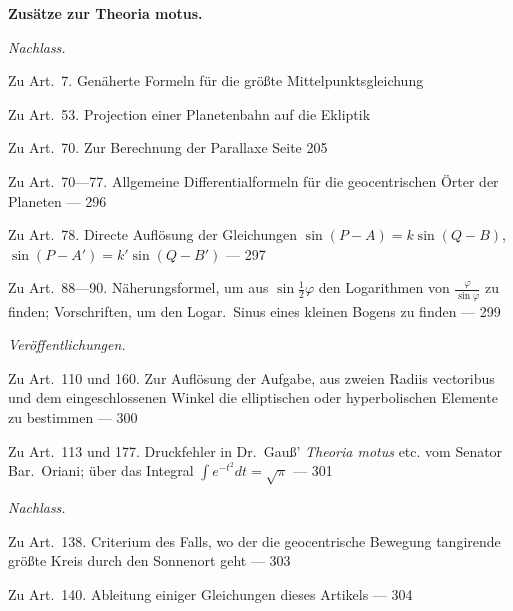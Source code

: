\documentclass[10pt,a4paper]{article}
\newenvironment{hangparas}[2]{\setlength{\hangindent}{#1}\setlength{\hangafter}{#2}}{}
\begin{document}
\vspace{0.3em}

\noindent\textbf{Zusätze zur Theoria motus.}

\vspace{0.2em}

\noindent\textit{Nachlass.}

\vspace{0.2em}

\begin{hangparas}{1em}{1}
\noindent Zu Art.~7. Genäherte Formeln für die größte Mittelpunktsgleichung

\noindent Zu Art.~53. Projection einer Planetenbahn auf die Ekliptik

\noindent Zu Art.~70. Zur Berechnung der Parallaxe \hfill Seite 205

\noindent Zu Art.~70---77. Allgemeine Differentialformeln für die geocentrischen Örter der Planeten \hfill --- 296

\noindent Zu Art.~78. Directe Auflösung der Gleichungen $\sin(P-A) = k\sin(Q-B)$, $\sin(P-A') = k'\sin(Q-B')$ \hfill --- 297

\noindent Zu Art.~88---90. Näherungsformel, um aus $\sin \frac{1}{2}\varphi$ den Logarithmen von $\frac{\varphi}{\sin \varphi}$ zu finden; Vorschriften, um den Logar.~Sinus eines kleinen Bogens zu finden \hfill --- 299
\end{hangparas}

\vspace{0.3em}

\noindent\textit{Veröffentlichungen.}

\vspace{0.2em}

\begin{hangparas}{1em}{1}
\noindent Zu Art.~110 und 160. Zur Auflösung der Aufgabe, aus zweien Radiis vectoribus und dem eingeschlossenen Winkel die elliptischen oder hyperbolischen Elemente zu bestimmen \hfill --- 300

\noindent Zu Art.~113 und 177. Druckfehler in Dr.~Gau\ss' \textit{Theoria motus} etc. vom Senator Bar.\ Oriani; über das Integral $\int e^{-t^2} dt = \sqrt{\pi}$ \hfill --- 301
\end{hangparas}

\vspace{0.3em}

\noindent\textit{Nachlass.}

\vspace{0.2em}

\begin{hangparas}{1em}{1}
\noindent Zu Art.~138. Criterium des Falls, wo der die geocentrische Bewegung tangirende größte Kreis durch den Sonnenort geht \hfill --- 303

\noindent Zu Art.~140. Ableitung einiger Gleichungen dieses Artikels \hfill --- 304
\end{hangparas}
\end{document}
